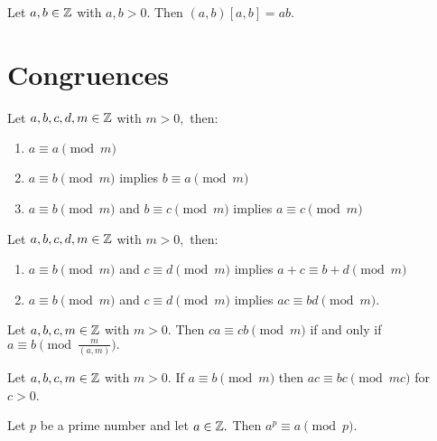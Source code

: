 \documentclass[letterpaper, 11 pt]{ximera}
\begin{document}
\begin{thm*}[Theorem 1.19]\label{thm:prod-lcm-gcd} Let $a,b\in\mathbb Z$ with $a,b\gt 0.$ Then $(a,b)[a,b]=ab.$
\end{thm*}

\section*{Congruences}

\begin{prop*}[Proposition 2.1]\label{prop:equiv-rel}
    Let $a,b,c,d,m\in\mathbb Z$ with $m>0,$ then:
        \begin{enumerate}
            \item\label{equiv-reflect} $a\equiv a \pmod{m}$
            
            \item\label{equiv-sym} $a\equiv b \pmod{m}$ implies $b\equiv a \pmod{m}$

            \item\label{equiv-trans} $a\equiv b \pmod{m}$ and $b\equiv c \pmod{m}$ implies $a\equiv c \pmod{m}$
\end{enumerate}
\end{prop*}


\begin{prop*}[Proposition 2.4]\label{prop:add-mult}
    Let $a,b,c,d,m\in\mathbb Z$ with $m>0,$ then:
    
    \begin{enumerate}[label=(\alph*)]
        \item\label{equiv-add} $a\equiv b \pmod{m}$ and $c\equiv d \pmod{m}$ implies $a+c \equiv b+d \pmod{m}$ 
        \item\label{equiv-multiply} $a\equiv b\pmod{m}$ and $c\equiv d \pmod{m}$ implies $ac\equiv bd \pmod{m}$.
    \end{enumerate}
\end{prop*}


\begin{prop*}[Proposition 2.5]\label{prop:equiv-gcd}
    Let $a,b,c,m\in\mathbb Z$ with $m>0.$ Then $ca\equiv cb\pmod{m}$ if and only if $a\equiv b\pmod{\tfrac{m}{(a,m)}}.$
\end{prop*}


\begin{lem*}\label{ex-equiv-upmod}
    Let $a,b,c,m\in\mathbb Z$ with $m>0.$ If $a\equiv b \pmod{m}$ then $ac\equiv bc \pmod{mc}$ for $c>0$.
\end{lem*}


\begin{cor*}[Corollary 2.15]\label{cor:a_power_prime_mod}
    Let $p$ be a prime number and let $a\in\mathbb Z.$ Then $a^p\equiv a\pmod{p}.$
\end{cor*}
\end{document}
